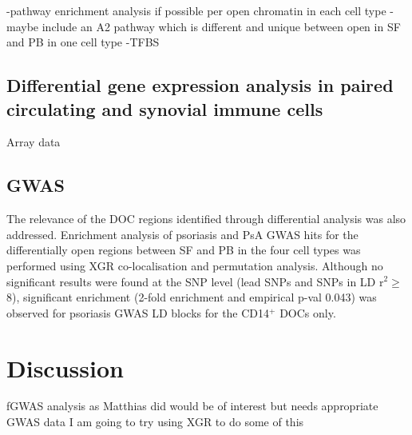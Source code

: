 -pathway enrichment analysis if possible per open chromatin in each cell type
-maybe include an A2 pathway which is different and unique between open in SF and PB in one cell type
-TFBS



\subsection{Differential gene expression analysis in paired circulating and synovial immune cells}
Array data


\subsection {GWAS}

 
The relevance of the DOC regions identified through differential analysis was also addressed. Enrichment analysis of psoriasis and PsA GWAS hits for the differentially open regions between SF and PB in the four cell types was performed using XGR co-localisation and permutation analysis. Although no significant results were found at the SNP level (lead SNPs and SNPs in LD r$^2$$\geq$8), significant enrichment (2-fold enrichment and empirical p-val 0.043) was observed for psoriasis GWAS LD blocks for the CD14$^+$ DOCs only.



\section{Discussion}
%


fGWAS analysis as Matthias did would be of interest but needs appropriate GWAS data
I am going to try using XGR to do some of this 



